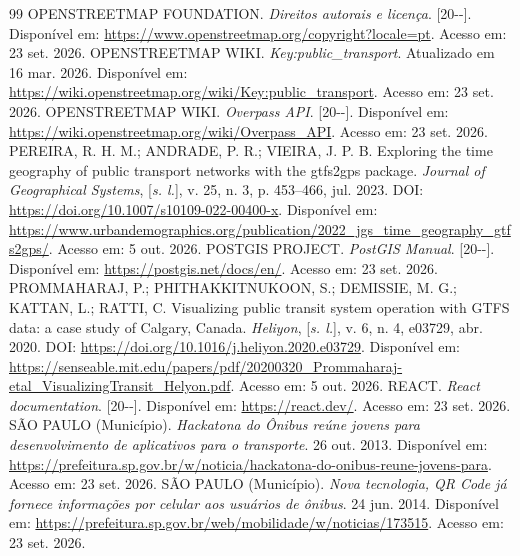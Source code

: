 \documentclass[12pt,oneside,a4paper,brazil,chapter=TITLE]{abntex2}
\begin{document}
\begin{thebibliography}{99}
 OPENSTREETMAP FOUNDATION. \textit{Direitos autorais e licença}. [20\mbox{-}\mbox{-}]. Disponível em: \url{https://www.openstreetmap.org/copyright?locale=pt}. Acesso em: 23 set. 2026.
 OPENSTREETMAP WIKI. \textit{Key:public\_transport}. Atualizado em 16 mar. 2026. Disponível em: \url{https://wiki.openstreetmap.org/wiki/Key:public_transport}. Acesso em: 23 set. 2026.
 OPENSTREETMAP WIKI. \textit{Overpass API}. [20\mbox{-}\mbox{-}]. Disponível em: \url{https://wiki.openstreetmap.org/wiki/Overpass_API}. Acesso em: 23 set. 2026.
 PEREIRA, R. H. M.; ANDRADE, P. R.; VIEIRA, J. P. B. Exploring the time geography of public transport networks with the gtfs2gps package. \textit{Journal of Geographical Systems}, [\textit{s. l.}], v. 25, n. 3, p. 453--466, jul. 2023. DOI: \url{https://doi.org/10.1007/s10109-022-00400-x}. Disponível em: \url{https://www.urbandemographics.org/publication/2022_jgs_time_geography_gtfs2gps/}. Acesso em: 5 out. 2026.
 POSTGIS PROJECT. \textit{PostGIS Manual}. [20\mbox{-}\mbox{-}]. Disponível em: \url{https://postgis.net/docs/en/}. Acesso em: 23 set. 2026.
 PROMMAHARAJ, P.; PHITHAKKITNUKOON, S.; DEMISSIE, M. G.; KATTAN, L.; RATTI, C. Visualizing public transit system operation with GTFS data: a case study of Calgary, Canada. \textit{Heliyon}, [\textit{s. l.}], v. 6, n. 4, e03729, abr. 2020. DOI: \url{https://doi.org/10.1016/j.heliyon.2020.e03729}. Disponível em: \url{https://senseable.mit.edu/papers/pdf/20200320_Prommaharaj-etal_VisualizingTransit_Helyon.pdf}. Acesso em: 5 out. 2026.
 REACT. \textit{React documentation}. [20\mbox{-}\mbox{-}]. Disponível em: \url{https://react.dev/}. Acesso em: 23 set. 2026.
 SÃO PAULO (Município). \textit{Hackatona do Ônibus reúne jovens para desenvolvimento de aplicativos para o transporte}. 26 out. 2013. Disponível em: \url{https://prefeitura.sp.gov.br/w/noticia/hackatona-do-onibus-reune-jovens-para}. Acesso em: 23 set. 2026.
 SÃO PAULO (Município). \textit{Nova tecnologia, QR Code já fornece informações por celular aos usuários de ônibus}. 24 jun. 2014. Disponível em: \url{https://prefeitura.sp.gov.br/web/mobilidade/w/noticias/173515}. Acesso em: 23 set. 2026.

\end{thebibliography}
\end{document}
